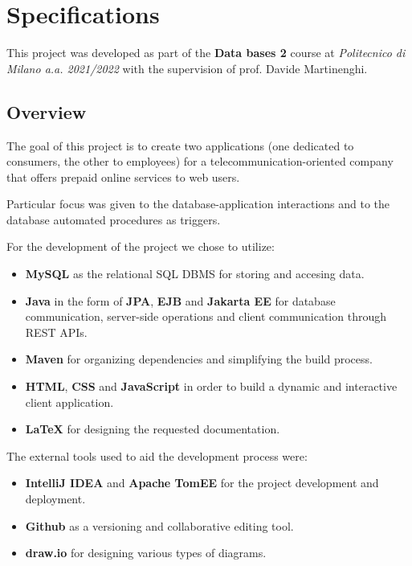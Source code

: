 
\chapter{Specifications}
\label{chap:specifications}

This project was developed as part of the \textbf{Data bases 2} course at \textit{Politecnico di Milano a.a. 2021/2022} with the supervision of prof. Davide Martinenghi.


\section{Overview}
\label{sec:overview}

The goal of this project is to create two applications (one dedicated to consumers, the other to employees) for a telecommunication-oriented company that offers prepaid online services to web users. 

Particular focus was given to the database-application interactions and to the database automated procedures as triggers. 

For the development of the project we chose to utilize:
\begin{itemize}
    \item \textbf{MySQL} as the relational SQL DBMS for storing and accesing data. 
    \item \textbf{Java} in the form of \textbf{JPA}, \textbf{EJB} and \textbf{Jakarta EE} for database communication, server-side operations and client communication through REST APIs.
    \item \textbf{Maven} for organizing dependencies and simplifying the build process.
    \item \textbf{HTML}, \textbf{CSS} and \textbf{JavaScript} in order to build a dynamic and interactive client application.
    \item \textbf{\LaTeX} for designing the requested documentation.
\end{itemize}

The external tools used to aid the development process were:
\begin{itemize}
    \item \textbf{IntelliJ IDEA} and \textbf{Apache TomEE} for the project development and deployment.
    \item \textbf{Github} as a versioning and collaborative editing tool.
    \item \textbf{draw.io} for designing various types of diagrams.
\end{itemize}

